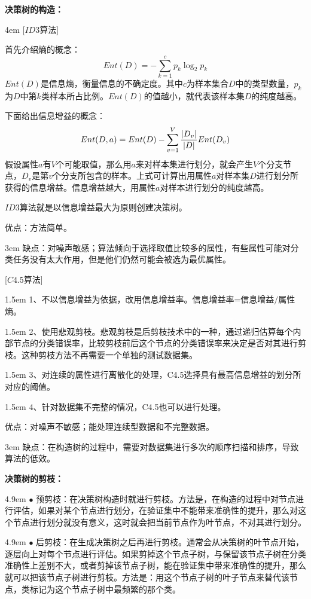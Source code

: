 \documentclass[a4paper, 11pt]{article}
\begin{document}
\begin{CJK*}{GBK}{song}
{\bf 决策树的构造：}

\hangindent 4em
[$ID3$算法]

首先介绍熵的概念：
$$Ent(D) =  - \sum\limits_{k = 1}^c {{p_k}{{\log }_2}{p_k}} $$
$Ent(D)$是信息熵，衡量信息的不确定度。其中$c$为样本集合$D$中的类型数量，$p_k$为$D$中第$k$类样本所占比例。$Ent(D)$的值越小，就代表该样本集$D$的纯度越高。

下面给出信息增益的概念：
$$Ent(D,a) = Ent(D) - \sum\limits_{v = 1}^V {{{|{D_v}|} \over {|D|}}Ent({D_v})} $$
假设属性$a$有$V$个可能取值，那么用$a$来对样本集进行划分，就会产生$V$个分支节点，$D_v$是第$v$个分支所包含的样本。上式可计算出用属性$a$对样本集$D$进行划分所获得的信息增益。信息增益越大，用属性$a$对样本进行划分的纯度越高。

$ID3$算法就是以信息增益最大为原则创建决策树。

优点：方法简单。

\hangindent 3em
缺点：对噪声敏感；算法倾向于选择取值比较多的属性，有些属性可能对分类任务没有太大作用，但是他们仍然可能会被选为最优属性。


[$C4.5$算法]

\hangindent 1.5em
1、不以信息增益为依据，改用信息增益率。信息增益率=信息增益$/$属性熵。

\hangindent 1.5em
2、使用悲观剪枝。悲观剪枝是后剪枝技术中的一种，通过递归估算每个内部节点的分类错误率，比较剪枝前后这个节点的分类错误率来决定是否对其进行剪枝。这种剪枝方法不再需要一个单独的测试数据集。

\hangindent 1.5em
3、对连续的属性进行离散化的处理，C4.5选择具有最高信息增益的划分所对应的阈值。

\hangindent 1.5em
4、针对数据集不完整的情况，C4.5也可以进行处理。

优点：对噪声不敏感；能处理连续型数据和不完整数据。

\hangindent 3em
缺点：在构造树的过程中，需要对数据集进行多次的顺序扫描和排序，导致算法的低效。

{\bf 决策树的剪枝：}

\hangindent 4.9em
$\bullet$ 预剪枝：在决策树构造时就进行剪枝。方法是，在构造的过程中对节点进行评估，如果对某个节点进行划分，在验证集中不能带来准确性的提升，那么对这个节点进行划分就没有意义，这时就会把当前节点作为叶节点，不对其进行划分。

\hangindent 4.9em
$\bullet$ 后剪枝：在生成决策树之后再进行剪枝。通常会从决策树的叶节点开始，逐层向上对每个节点进行评估。如果剪掉这个节点子树，与保留该节点子树在分类准确性上差别不大，或者剪掉该节点子树，能在验证集中带来准确性的提升，那么就可以把该节点子树进行剪枝。方法是：用这个节点子树的叶子节点来替代该节点，类标记为这个节点子树中最频繁的那个类。

\end{CJK*}
\end{document}
